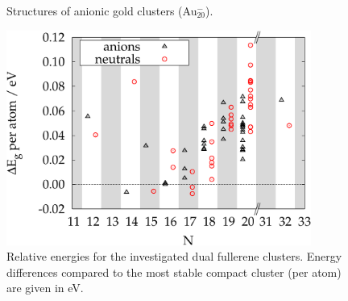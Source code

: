 \begin{figure}
\begin{center}
	\caption{Structures of anionic gold clusters (Au$_{20}^-$).}
	\label{fig:Au20-}
\end{center}
\end{figure} 

\begin{figure}[htbp]
\begin{center}
\includegraphics[width=10cm]{golddual/energies.pdf}
\caption{Relative energies for the investigated dual fullerene clusters.
Energy differences compared to the most stable compact cluster (per atom) are given in eV.}
\label{fig:AunMinus2}
\end{center}
\end{figure}

